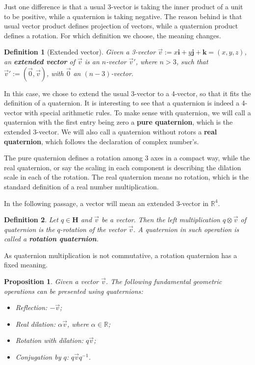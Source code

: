 \documentclass[12pt]{article}
\newtheorem*{definition}{Definition}
\newtheorem*{proposition}{Proposition}
\begin{document}
    Just one difference is that a usual 3-vector is taking the inner product of a unit to be positive, while a quaternion is taking negative. The reason behind is that usual vector product defines projection of vectors, while a quaternion product defines a rotation. For which definition we choose, the meaning changes.

    \begin{definition}[Extended vector]
        Given a 3-vector $\vec{v}:=x\mathbf{i}+y\mathbf{j}+\mathbf{k}=(x,y,z)$, an \textbf{extended vector} of $\vec{v}$ is an $n$-vector $\vec{v}'$, where $n>3$, such that $\vec{v}':=(\vec{0},\vec{v})$, with $\vec{0}$ an $(n-3)$-vector.
    \end{definition}

    In this case, we chose to extend the usual 3-vector to a 4-vector, so that it fits the definition of a quaternion. It is interesting to see that a quaternion is indeed a 4-vector with special arithmetic rules. To make sense with quaternion, we will call a quaternion with the first entry being zero a \textbf{pure quaternion}, which is the extended 3-vector. We will also call a quaternion without rotors a \textbf{real quaternion}, which follows the declaration of complex number's.

    The pure quaternion defines a rotation among 3 axes in a compact way, while the real quaternion, or say the scaling in each component is describing the dilation scale in each of the rotation. The real quaternion means no rotation, which is the standard definition of a real number multiplication.

    In the following passage, a vector will mean an extended 3-vector in $\mathbb{R}^4$.

    \begin{definition}
        Let $q\in\mathbf{H}$ and $\vec{v}$ be a vector. Then the left multiplication $q\otimes \vec{v}$ of quaternion is the $q$-rotation of the vector $\vec{v}$. A quaternion in such operation is called a \textbf{rotation quaternion}.
    \end{definition}

    As quaternion multiplication is not commutative, a rotation quaternion has a fixed meaning.

    \begin{proposition}
        Given a vector $\vec{v}$. The following fundamental geometric operations can be presented using quaternions:\begin{itemize}
            \item Reflection: $-\vec{v}$;
            \item Real dilation: $\alpha\vec{v}$, where $\alpha\in\mathbb{R}$;
            \item Rotation with dilation: $q\vec{v}$;
            \item Conjugation by $q$: $q\vec{v}q^{-1}$.
        \end{itemize}
    \end{proposition}
\end{document}

